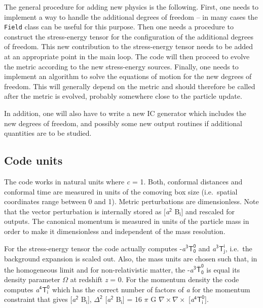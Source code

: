 \documentclass[a4paper,10pt]{article}
\begin{document}
\noindent The general procedure for adding new physics is the following. First, one needs to implement a way to handle the additional
degrees of freedom -- in many cases the \texttt{Field} class can be useful for this purpose. Then one needs a procedure to construct the
stress-energy tensor for the configuration of the additional degrees of freedom. This new contribution to the stress-energy tensor needs to
be added at an appropriate point in the main loop. The code will then proceed to evolve the metric according to the new stress-energy
sources. Finally, one needs to implement an algorithm to solve the equations of motion for the new degrees of freedom. This will generally
depend on the metric and should therefore be called after the metric is evolved, probably somewhere close to the particle update.

In addition, one will also have to write a new IC generator which includes the new degrees of freedom, and possibly some new output routines
if additional quantities are to be studied.

\subsection{Code units}
\label{sec:units}

The code works in natural units where \textit{c} = 1. Both, conformal distances and conformal time are measured in units of the comoving box
size (i.e.\ spatial coordinates range between 0 and 1). Metric perturbations are dimensionless. Note that the vector perturbation is internally
stored as [\textit{a}$^\mathsf{2}$ B$_\mathsf{i}$] and rescaled for outputs. The canonical momentum is measured in units
of the particle mass in order to make it dimensionless and independent of the mass resolution.

For the stress-energy tensor the code actually computes -\textit{a}$^\mathsf{3} \mathsf{T^0_0}$ and \textit{a}$^\mathsf{3} \mathsf{T^i_j}$,
i.e.\ the background expansion is scaled out. Also, the mass units are chosen such that, in the homogeneous limit and for non-relativistic
matter, the -\textit{a}$^\mathsf{3}\mathsf{\bar{T}^0_0}$ is equal its density parameter $\mathsf{\Omega}$ at redshift \textit{z} = 0. For the
momentum density the code computes \textit{a}$^\mathsf{4} \mathsf{T^0_i}$ which has the correct number of factors of \textit{a} for the
momentum constraint that gives [\textit{a}$^\mathsf{2}$ B$_\mathsf{i}$], $\mathsf{\Delta}^\mathsf{2}$ [\textit{a}$^\mathsf{2}$ B$_\mathsf{i}$] = 16 $\mathsf{\pi}$ G $\mathsf{\nabla}\!\times\!\mathsf{\nabla}\times\!$ [\textit{a}$^\mathsf{4} \mathsf{T^0_i}$].
\end{document}
